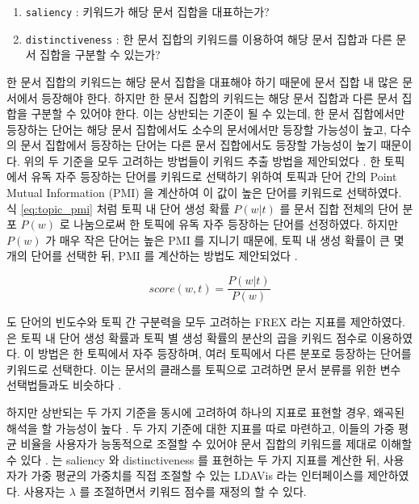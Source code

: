 \documentclass[11pt]{article}
\begin{document}
\begin{enumerate}[noitemsep]
  \item \texttt{saliency} : 키워드가 해당 문서 집합을 대표하는가?
  \item \texttt{distinctiveness} : 한 문서 집합의 키워드를 이용하여 해당 문서 집합과 다른 문서 집합을 구분할 수 있는가?
\end{enumerate}

한 문서 집합의 키워드는 해당 문서 집합을 대표해야 하기 때문에 문서 집합 내 많은 문서에서 등장해야 한다.
하지만 한 문서 집합의 키워드는 해당 문서 집합과 다른 문서 집합을 구분할 수 있어야 한다.
이는 상반되는 기준이 될 수 있는데, 한 문서 집합에서만 등장하는 단어는 해당 문서 집합에서도 소수의 문서에서만 등장할 가능성이 높고, 다수의 문서 집합에서 등장하는 단어는 다른 문서 집합에서도 등장할 가능성이 높기 때문이다.
위의 두 기준을 모두 고려하는 방법들이 키워드 추출 방법을 제안되었다 \citep{bischof2012summarizing, newman2010evaluating, taddy2012estimation}.
한 토픽에서 유독 자주 등장하는 단어를 키워드로 선택하기 위하여 \citep{newman2010evaluating, taddy2012estimation, mimno2011optimizing} 토픽과 단어 간의 Point Mutual Information (PMI) 을 계산하여 이 값이 높은 단어를 키워드로 선택하였다.
식 \ref{eq:topic_pmi} 처럼 토픽 내 단어 생성 확률 $P(w \vert t)$ 를 문서 집합 전체의 단어 분포 $P(w)$ 로 나눔으로써 한 토픽에 유독 자주 등장하는 단어를 선정하였다.
하지만 $P(w)$ 가 매우 작은 단어는 높은 PMI 를 지니기 때문에, 토픽 내 생성 확률이 큰 몇 개의 단어를 선택한 뒤, PMI 를 계산하는 방법도 제안되었다 \citep{newman2010evaluating, alsumait2009topic}.

\begin{equation}
  \label{eq:topic_pmi}
  score(w,t) = \frac{P(w \vert t)}{P(w)}
\end{equation}

\citep{bischof2012summarizing} 도 단어의 빈도수와 토픽 간 구분력을 모두 고려하는 FREX 라는 지표를 제안하였다.
\citep{song2009topic} 은 토픽 내 단어 생성 확률과 토픽 별 생성 확률의 분산의 곱을 키워드 점수로 이용하였다.
이 방법은 한 토픽에서 자주 등장하며, 여러 토픽에서 다른 분포로 등장하는 단어를 키워드로 선택한다.
이는 문서의 클래스를 토픽으로 고려하면 문서 분류를 위한 변수 선택법들과도 비슷하다 \citep{largeron2011entropy, popescul2000automatic}.

하지만 상반되는 두 가지 기준을 동시에 고려하여 하나의 지표로 표현할 경우, 왜곡된 해석을 할 가능성이 높다 \citep{chuang2012interpretation}. 
두 가지 기준에 대한 지표를 따로 마련하고, 이들의 가중 평균 비율을 사용자가 능동적으로 조절할 수 있어야 문서 집합의 키워드를 제대로 이해할 수 있다 \citep{chuang2012interpretation}.
\citep{sievert2014ldavis}는 saliency 와 distinctiveness 를 표현하는 두 가지 지표를 계산한 뒤, 사용자가 가중 평균의 가중치를 직접 조절할 수 있는 LDAVis 라는 인터페이스를 제안하였다.
사용자는 $\lambda$ 를 조절하면서 키워드 점수를 재정의 할 수 있다.
\end{document}
